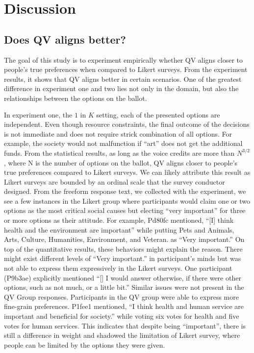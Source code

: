 \section{Discussion} \label{discussion}

\subsection{Does QV aligns better?}
The goal of this study is to 
experiment empirically whether
QV aligns closer to people's true preferences 
when compared to Likert surveys.
From the experiment results,
it shows that QV aligns better 
in certain scenarios.
One of the greatest difference
in experiment one and two
lies not only in the domain,
but also the relationships between
the options on the ballot.

In experiment one,
the $1$ in $K$ setting,
each of the presented options
are independent.
Even though resource constraints,
the final outcome of the decisions
is not immediate and does not require
strick combination of all options.
For example,
the society would not malfunction if ``art''
does not get the additional funds.
From the statistical results,
as long as the voice credits 
are more than $N^{3/2}$, where N is the number of options on the ballot,
QV aligns closer to people's true preferences
compared to Likert surveys.
We can likely attribute this result 
as Likert surveys are bounded by an ordinal scale 
that the survey conductor designed. 
From the freeform response text, we collected
with the experiment,
we see a few instances in the Likert group 
where participants would claim one or two options 
as the most critical social causes 
but electing ``very important'' for 
three or more options as their attitude.
For example, Pd80fc mentioned, ``[I] think health and the environment are important'' while putting Pets and Animals, Arts, Culture, Humanities, Environment, and Veteran. as ``Very important.''
On top of the quantitative results,
these behaviors might explain the reason.
There might exist different levels of ``Very important.'' 
in participant's minds but was not able to express them expressively in the Likert surveys.
One participant (P9b3ae) explicitly mentioned ``[\textellipsis] I would answer otherwise, if there were other options, such as not much, or a little bit.''
Similar issues were not present in the QV Group responses.
Participants in the QV group were able to express more fine-grain preferences.
P1fee1 mentioned, ``I think health and human service are important and beneficial for society.'' while voting six votes for health and five votes for human services. This indicates that despite being ``important'', there is still a difference in weight and shadowed the limitation of Likert survey, where people can be limited by the options they were given.\par

